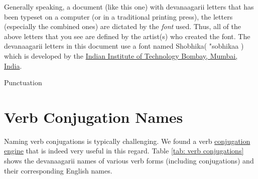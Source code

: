 \documentclass[a4paper, 12pt]{article}
\newcommand \sans[1]{
    \textsanskrit{#1}
}
\begin{document}
Generally speaking, a document (like this one) with \sans{devanaagarii} letters that has been typeset on a computer (or in a traditional printing press), the letters (especially the combined ones) are dictated by the \emph{font} used. Thus, all of the above letters that you see are defined by the artist(s) who created the font. The \sans{devanaagarii} letters in this document use a font named Shobhika(\sans{"sobhikaa}) which is developed by the \href{https://github.com/Sandhi-IITBombay/Shobhika}{Indian Institute of Technology Bombay, Mumbai, India}.

Punctuation 



\newpage
\appendix
\section {Verb Conjugation Names}
Naming verb conjugations is typically challenging. We found a verb \href{https://sanskrit.inria.fr/cgi-bin/SKT/sktconjug.cgi?q=bhuu;c=1;font=deva}{conjugation engine} that is indeed very useful in this regard. Table \ref{tab: verb conjugations} shows the \sans{devanaagarii} names of various verb forms (including conjugations) and their corresponding English names.
\end{document}
